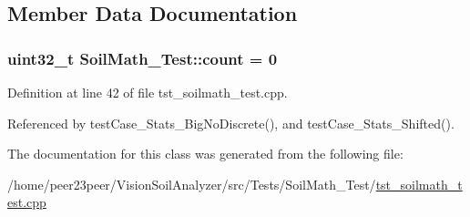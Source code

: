 \subsection{Member Data Documentation}
\hypertarget{class_soil_math___test_a693af150765ec63434f414f36e27b91e}{}
\subsubsection[{count}]{\setlength{\rightskip}{0pt plus 5cm}uint32\+\_\+t Soil\+Math\+\_\+\+Test\+::count = 0\hspace{0.3cm}{\ttfamily [private]}}\label{class_soil_math___test_a693af150765ec63434f414f36e27b91e}


Definition at line 42 of file tst\+\_\+soilmath\+\_\+test.\+cpp.



Referenced by test\+Case\+\_\+\+Stats\+\_\+\+Big\+No\+Discrete(), and test\+Case\+\_\+\+Stats\+\_\+\+Shifted().



The documentation for this class was generated from the following file\+:\begin{DoxyCompactItemize}
\item 
/home/peer23peer/\+Vision\+Soil\+Analyzer/src/\+Tests/\+Soil\+Math\+\_\+\+Test/\hyperlink{tst__soilmath__test_8cpp}{tst\+\_\+soilmath\+\_\+test.\+cpp}\end{DoxyCompactItemize}
